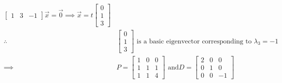 \begin{align*}
\begin{bmatrix}
    1 & 3 & -1
    \end{bmatrix} \vec{x} = \vec{0} \implies \vec{x} = t \begin{bmatrix}
    0 \\
    1 \\
    3
    \end{bmatrix} \\
    \therefore \quad &\begin{bmatrix}
    0 \\
    1 \\
    3
    \end{bmatrix} \text{ is a basic eigenvector corresponding to } \lambda_3 = -1 \\
    \implies &P = \begin{bmatrix}
    1 & 0 & 0 \\
    1 & 1 & 1 \\
    1 & 1 & 4
    \end{bmatrix} \text{ and} D = \begin{bmatrix}
    2 & 0 & 0 \\
    0 & 1 & 0 \\
    0 & 0 & -1
    \end{bmatrix} \\
\end{align*}

